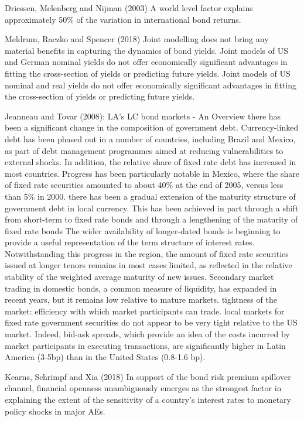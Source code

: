 Driessen, Melenberg and Nijman (2003)
A world level factor explains approximately 50\% of the variation in international bond returns.


Meldrum, Raczko and Spencer (2018)
Joint modelling does not bring any material benefits in capturing the dynamics of bond yields.
Joint models of US and German nominal yields do not offer economically significant advantages in fitting the cross-section of yields or predicting future yields. 
Joint models of US nominal and real yields do not offer economically significant advantages in fitting the cross-section of yields or predicting future yields.

Jeanneau and Tovar (2008): LA's LC bond markets - An Overview
there has been a significant change in the composition of government debt. Currency-linked debt has been phased out in a number of countries, including Brazil and Mexico, as part of debt management programmes aimed at reducing vulnerabilities to external shocks. In addition, the relative share of fixed rate debt has increased in most countries. Progress has been particularly notable in Mexico, where the share of fixed rate securities amounted to about 40\% at the end of 2005, versus less than 5\% in 2000. 
there has been a gradual extension of the maturity structure of government debt in
local currency. This has been achieved in part through a shift from short-term to fixed rate bonds and through a lengthening of the maturity of fixed rate bonds
The wider availability of longer-dated bonds is beginning to provide a useful
representation of the term structure of interest rates. Notwithstanding this progress in the region, the amount of fixed rate securities issued at longer tenors remains in most cases limited, as reflected in the relative stability of the weighted average maturity of new issues.
Secondary market trading in domestic bonds, a common measure of liquidity, has
expanded in recent years, but it remains low relative to mature markets. tightness of the market: efficiency with which market participants can trade. local markets for
fixed rate government securities do not appear to be very tight relative to the US market.
Indeed, bid-ask spreads, which provide an idea of the costs incurred by market participants in executing transactions, are significantly higher in Latin America (3-5bp) than in the United States (0.8-1.6 bp).

Kearns, Schrimpf and Xia (2018)
In support of the bond risk premium spillover channel, financial openness unambiguously emerges as the strongest factor in explaining the extent of the sensitivity of a country's interest rates to monetary policy shocks in major AEs.

